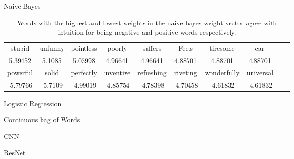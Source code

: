 \documentclass[11pt]{article}
\begin{document}
\begin{subsection}{Naive Bayes}
\begin{table}[h]
\centering
\begin{tabular}{cccccccccc}
 \midrule
 stupid & unfunny& pointless  & poorly & suffers & Feels & tiresome & car \\
   5.39452 & 5.1085& 5.03998 &4.96641&4.96641 & 4.88701 & 4.88701 & 4.88701 \\
 \bottomrule
 \bottomrule
 powerful  & solid& perfectly & inventive & refreshing & riveting & wonderfully & universal \\
  -5.79766 & -5.7109 & -4.99019 & -4.85754 & -4.78398 & -4.70458 & -4.61832 & -4.61832 \\
 \bottomrule
\end{tabular}
\caption{\label{tab:nbwords} Words with the highest and lowest weights in the naive bayes weight vector agree with intuition for being negative and positive words respectively.}
\end{table}

\end{subsection}




\begin{subsection}{Logistic Regression}

\end{subsection}




\begin{subsection}{Continuous bag of Words}

\end{subsection}


\begin{subsection}{CNN}

\end{subsection}





\begin{subsection}{ResNet}

\end{subsection}
\end{document}
